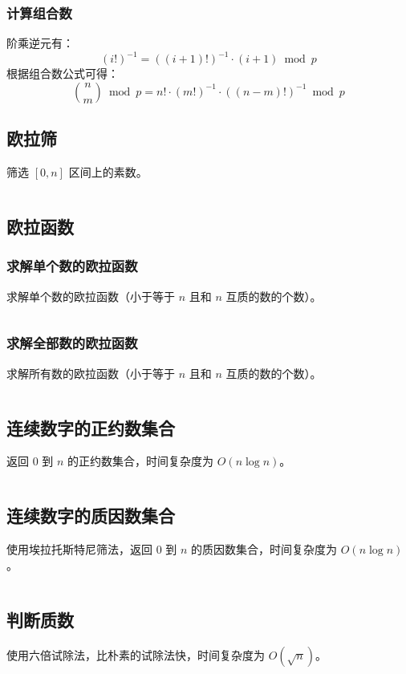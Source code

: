 \documentclass[a4paper, twoside]{article}
\begin{document}
    \subsubsection{计算组合数}
    阶乘逆元有：
    $$(i!)^{-1}=((i+1)!)^{-1} \cdot (i+1) \bmod p$$
    根据组合数公式可得：
    $$\binom{n}{m} \bmod p = n! \cdot (m!)^{−1} \cdot ((n−m)!)^{−1} \bmod p$$

\subsection{欧拉筛}
筛选 $[0,n]$ 区间上的素数。
\inputminted{cpp}{../src/数论/欧拉筛.cpp}

\subsection{欧拉函数}
    \subsubsection{求解单个数的欧拉函数}
    求解单个数的欧拉函数（小于等于 $n$ 且和 $n$ 互质的数的个数）。
    \inputminted{cpp}{../src/数论/欧拉函数（求解单个数的欧拉函数）.cpp}

    \subsubsection{求解全部数的欧拉函数}
    求解所有数的欧拉函数（小于等于 $n$ 且和 $n$ 互质的数的个数）。
    \inputminted{cpp}{../src/数论/欧拉函数（求解全部数的欧拉函数）.cpp}

\subsection{连续数字的正约数集合}
返回 $0$ 到 $n$ 的正约数集合，时间复杂度为 $O(n \log n)$。
\inputminted{cpp}{../src/数论/连续数字的正约数集合.cpp}

\subsection{连续数字的质因数集合}
使用埃拉托斯特尼筛法，返回 $0$ 到 $n$ 的质因数集合，时间复杂度为 $O(n \log n)$。
\inputminted{cpp}{../src/数论/连续数字的质因数集合（埃氏筛）.cpp}

\subsection{判断质数}
使用六倍试除法，比朴素的试除法快，时间复杂度为 $O(\sqrt n)$。
\inputminted{cpp}{../src/数论/判断质数.cpp}
\end{document}
